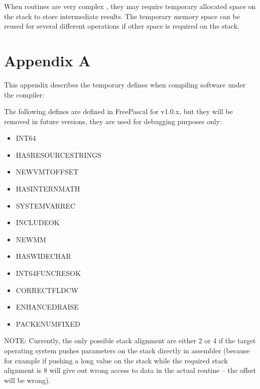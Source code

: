 \documentclass [12pt]{article}
\begin{document}
When routines are very complex , they may require temporary allocated space 
on the stack to store intermediate results. The temporary memory space can 
be reused for several different operations if other space is required on the 
stack. 

\section{Appendix A}
\label{sec:appendix}

This appendix describes the temporary defines when compiling software under 
the compiler:

The following defines are defined in FreePascal for v1.0.x, but they will be 
removed in future versions, they are used for debugging purposes only:

\begin{itemize}
\item INT64
\item HASRESOURCESTRINGS
\item NEWVMTOFFSET 
\item HASINTERNMATH 
\item SYSTEMVARREC 
\item INCLUDEOK 
\item NEWMM
\item HASWIDECHAR
\item INT64FUNCRESOK 
\item CORRECTFLDCW 
\item ENHANCEDRAISE 
\item PACKENUMFIXED
\end{itemize}

NOTE: Currently, the only possible stack alignment are either 2 or 4 if the
target operating system pushes parameters on the stack directly in assembler
(because for example if pushing a long value on the stack while the required
stack alignment is 8 will give out wrong access to data in the actual
routine -- the offset will be wrong).

\printindex
\end{document}
